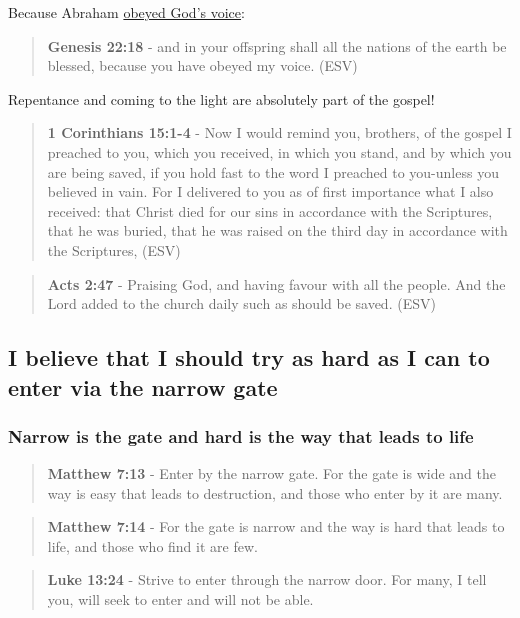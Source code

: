 \documentclass[11pt]{article}
\begin{document}
Because Abraham \uline{obeyed God's voice}:

\begin{quote}
\textbf{Genesis 22:18} - and in your offspring shall all the nations of the earth be blessed, because you have obeyed my voice. (ESV)
\end{quote}

Repentance and coming to the light are absolutely part of the gospel!

\begin{quote}
\textbf{1 Corinthians 15:1-4} -  Now I would remind you, brothers, of the gospel I preached to you, which you received, in which you stand, and by which you are being saved, if you hold fast to the word I preached to you-unless you believed in vain.  For I delivered to you as of first importance what I also received: that Christ died for our sins in accordance with the Scriptures, that he was buried, that he was raised on the third day in accordance with the Scriptures,  (ESV)
\end{quote}

\begin{quote}
\textbf{Acts 2:47} - Praising God, and having favour with all the people. And the Lord added to the church daily such as should be saved. (ESV)
\end{quote}

\subsection{I believe that I should try as hard as I can to enter via the narrow gate}
\label{sec:org9a46806}
\subsubsection{Narrow is the gate and hard is the way that leads to life}
\label{sec:org35d1422}
\begin{quote}
\textbf{Matthew 7:13} - Enter by the narrow gate. For the gate is wide and the way is easy that leads to destruction, and those who enter by it are many.
\end{quote}

\begin{quote}
\textbf{Matthew 7:14} - For the gate is narrow and the way is hard that leads to life, and those who find it are few.
\end{quote}

\begin{quote}
\textbf{Luke 13:24} - Strive to enter through the narrow door. For many, I tell you, will seek to enter and will not be able.
\end{quote}
\end{document}
